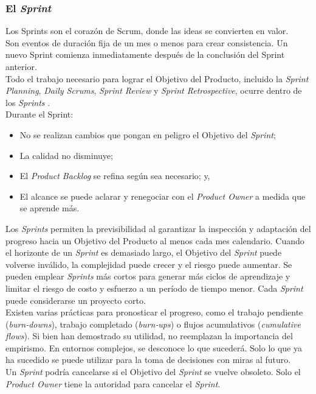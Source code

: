 \begin{spacing}{1.5}
		\subsubsection{El \textit{Sprint}}
			Los Sprints son el corazón de Scrum, donde las ideas se convierten en valor.\\
			Son eventos de duración fija de un mes o menos para crear consistencia. Un nuevo Sprint comienza inmediatamente después de la conclusión del Sprint anterior.\\
			Todo el trabajo necesario para lograr el Objetivo del Producto, incluido la \textit{Sprint Planning}, \textit{Daily Scrums}, \textit{Sprint Review} y \textit{Sprint Retrospective}, ocurre dentro de los \textit{Sprints} \cite{chap2_scrum}.\\
			Durante el Sprint:
			\begin{itemize}
				\item No se realizan cambios que pongan en peligro el Objetivo del \textit{Sprint};
				\item La calidad no disminuye;
				\item El \textit{Product Backlog} se refina según sea necesario; y,
				\item El alcance se puede aclarar y renegociar con el \textit{Product Owner} a medida que se aprende más.
			\end{itemize}
			Los \textit{Sprints} permiten la previsibilidad al garantizar la inspección y adaptación del progreso hacia un Objetivo del Producto al menos cada mes calendario. Cuando el horizonte de un \textit{Sprint} es demasiado largo, el Objetivo del \textit{Sprint} puede volverse inválido, la complejidad puede crecer y el riesgo puede aumentar. Se pueden emplear \textit{Sprints} más cortos para generar más ciclos de aprendizaje y limitar el riesgo de costo y esfuerzo a un período de tiempo menor. Cada \textit{Sprint} puede considerarse un proyecto corto.\\
			Existen varias prácticas para pronosticar el progreso, como el trabajo pendiente (\textit{burn‐downs}), trabajo completado (\textit{burn‐ups}) o flujos acumulativos (\textit{cumulative flows}). Si bien han demostrado su utilidad, no reemplazan la importancia del empirismo. En entornos complejos, se desconoce lo que sucederá. Solo lo que ya ha sucedido se puede utilizar para la toma de decisiones con miras al futuro.\\
			Un \textit{Sprint} podría cancelarse si el Objetivo del \textit{Sprint} se vuelve obsoleto. Solo el \textit{Product Owner} tiene la autoridad para cancelar el \textit{Sprint}.

\end{spacing}
